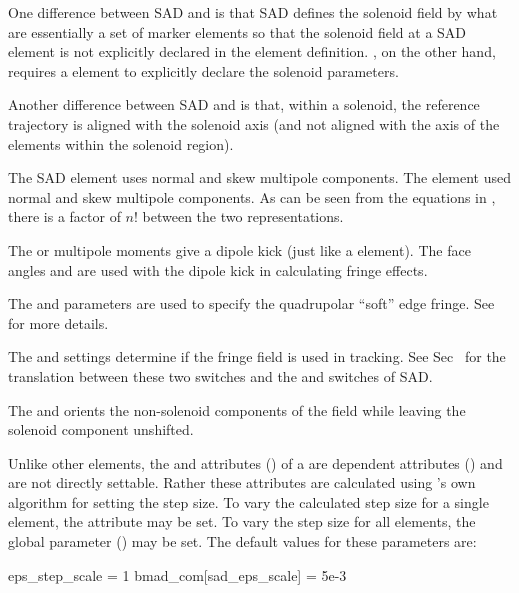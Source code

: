 {One difference between SAD and \bmad is that SAD defines the solenoid field by what are essentially
a set of marker elements so that the solenoid field at a SAD  element is not explicitly
declared in the  element definition. \bmad, on the other hand, requires a 
element to explicitly declare the solenoid parameters.

Another difference between SAD and \bmad is that, within a solenoid, the reference trajectory is
aligned with the solenoid axis (and not aligned with the axis of the elements within the solenoid
region).

The SAD  element uses normal  and skew  multipole components. The \bmad
{} element used normal  and skew  multipole components. As can be seen from
the equations in , there is a factor of $n!$ between the two representations.

The  or  multipole moments give a dipole kick (just like a  element). The
face angles  and  are used with the dipole kick in calculating fringe effects.

The  and  parameters are used to specify the quadrupolar ``soft'' edge fringe. See
 for more details.

The  and  settings determine if the fringe field is used in
tracking. See Sec~ for the translation between these two switches and the 
and  switches of SAD.

The  and  orients the non-solenoid components of the field while
leaving the solenoid component unshifted.

Unlike other elements, the  and  attributes () of a
 are dependent attributes () and are not directly settable. Rather these
attributes are calculated using 's own algorithm for setting the step size. To vary the
calculated step size for a single  element, the attribute  may be
set.  To vary the step size for all  elements, the global parameter
 () may be set.  The default values for these
parameters are:
\begin{example}
  eps_step_scale          = 1
  bmad_com[sad_eps_scale] = 5e-3
\end{example}

}
